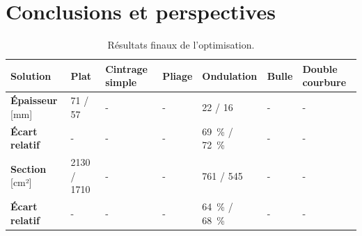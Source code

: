 \documentclass[11pt,titlepage]{article}
\begin{document}
\newpage

\section{Conclusions et perspectives}

\begin{table}[H]
    \centering
    \caption{Résultats finaux de l'optimisation.}
    \label{tab:result_fin}
    \begin{tabularx}{\textwidth}{l*{6}{Y}}
    \toprule
    \textbf{Solution} & \textbf{Plat}& \textbf{Cintrage simple} &\textbf{Pliage} & \textbf{Ondulation}& \textbf{Bulle}& \textbf{Double courbure} \\\midrule
    \textbf{Épaisseur} [mm]& 71 / 57 & - & - & 22 / 16 & - & - \\
    \textbf{Écart relatif} & - & - & - & \qty{69}{\percent} / \qty{72}{\percent} & - & - \\
    \textbf{Section} [cm²] & 2130 / 1710 & - & - & 761 / 545 & - & - \\
    \textbf{Écart relatif} & - & - & - & \qty{64}{\percent} / \qty{68}{\percent} & - & - \\
    \bottomrule
    \end{tabularx}
    \end{table}
\newpage

\printbibliography
\end{document}
